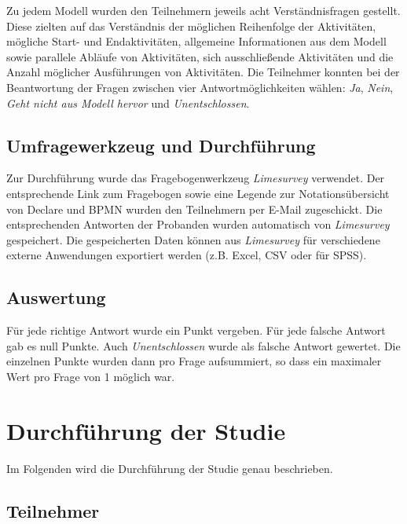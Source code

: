 Zu jedem Modell wurden den Teilnehmern jeweils acht Verständnisfragen gestellt. Diese zielten auf das Verständnis der möglichen Reihenfolge der Aktivitäten, mögliche Start- und Endaktivitäten, allgemeine Informationen aus dem Modell sowie parallele Abläufe von Aktivitäten, sich ausschließende Aktivitäten und die Anzahl möglicher Ausführungen von Aktivitäten.\newline
Die Teilnehmer konnten bei der Beantwortung der Fragen zwischen vier Antwortmöglichkeiten wählen: \textit{Ja}, \textit{Nein}, \textit{Geht nicht aus Modell hervor} und \textit{Unentschlossen}.

\subsection{Umfragewerkzeug und Durchführung}

Zur Durchführung wurde das Fragebogenwerkzeug \textit{Limesurvey} verwendet. Der entsprechende Link zum Fragebogen sowie eine Legende zur Notationsübersicht von Declare und BPMN wurden den Teilnehmern per E-Mail zugeschickt. Die entsprechenden Antworten der Probanden wurden automatisch von \textit{Limesurvey} gespeichert. Die gespeicherten Daten können aus \textit{Limesurvey} für verschiedene externe Anwendungen exportiert werden (z.B. Excel, CSV oder für SPSS).

\subsection{Auswertung}

Für jede richtige Antwort wurde ein Punkt vergeben. Für jede falsche Antwort gab es null Punkte. Auch \textit{Unentschlossen} wurde als falsche Antwort gewertet. Die einzelnen Punkte wurden dann pro Frage aufsummiert, so dass ein maximaler Wert pro Frage von 1 möglich war.

\section{Durchführung der Studie}

Im Folgenden wird die Durchführung der Studie genau beschrieben.

\subsection{Teilnehmer}

